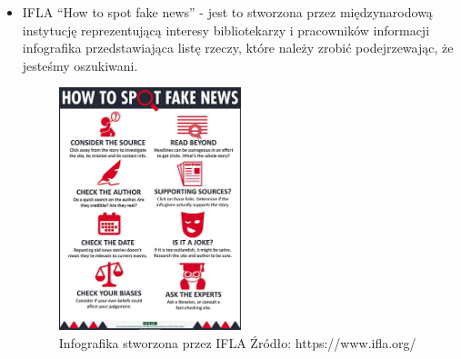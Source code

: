 \begin{itemize}
    \item IFLA ``How to spot fake news'' - jest to stworzona przez międzynarodową instytucję
    reprezentującą interesy bibliotekarzy i pracowników informacji infografika
    przedstawiająca listę rzeczy, które należy zrobić podejrzewając, że jesteśmy oszukiwani.

    \begin{figure}[h!]
        \centering
        \includegraphics[width=0.5\textwidth]{./Img/how-to-spot-fake-news.jpg}
        \caption{Infografika stworzona przez IFLA Źródło: https://www.ifla.org/}
    \end{figure}


\end{itemize}
